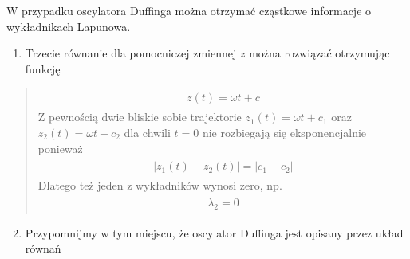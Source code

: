 \documentclass[a4paper,12pt,polish]{sphinxmanual}
\begin{document}
W przypadku oscylatora Duffinga można otrzymać cząstkowe  informacje o wykładnikach Lapunowa.
\begin{enumerate}
\item {} 
Trzecie równanie dla pomocniczej zmiennej $z$ można rozwiązać otrzymując funkcję

\end{enumerate}
\begin{quote}
\label{ch2/chII012:equation-eqn8}\begin{gather}
\begin{split}z(t) = \omega t + c\end{split}\label{ch2/chII012-eqn8}
\end{gather}
Z pewnością dwie bliskie sobie trajektorie $z_1(t) = \omega t+c_1$ oraz $z_2(t) = \omega t + c_2$ dla chwili   $t=0$ nie rozbiegają się eksponencjalnie ponieważ
\label{ch2/chII012:equation-eqn9}\begin{gather}
\begin{split}|z_1(t) - z_2(t)| = |c_1 -c_2|\end{split}\label{ch2/chII012-eqn9}
\end{gather}
Dlatego też jeden z wykładników wynosi zero, np.
\label{ch2/chII012:equation-eqn10}\begin{gather}
\begin{split}\lambda_2 = 0\end{split}\label{ch2/chII012-eqn10}
\end{gather}\end{quote}
\begin{enumerate}
\setcounter{enumi}{1}
\item {} 
Przypomnijmy w tym miejscu, że oscylator Duffinga jest opisany przez układ równań

\end{enumerate}
\end{document}
